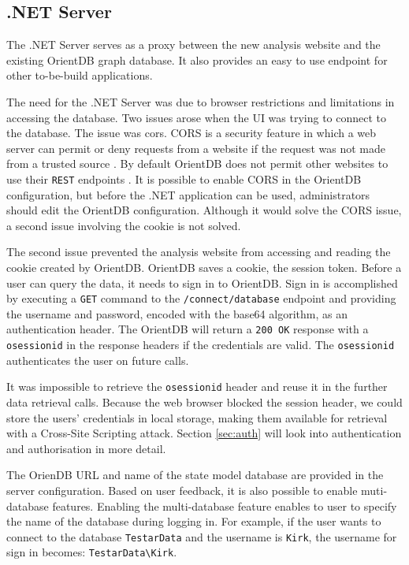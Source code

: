 \subsection{.NET Server} \label{sec:net-server}
The .NET Server serves as a proxy between the new \testar analysis website and the existing OrientDB graph database. It also provides an easy to use endpoint for other to-be-build applications.

The need for the .NET Server was due to browser restrictions and limitations in accessing the database. Two issues arose when the UI was trying to connect to the database. The issue was \acrfull{cors}. CORS is a security feature in which a web server can permit or deny requests from a website if the request was not made from a trusted source \cite{cors}. By default OrientDB does not permit other websites to use their \verb|REST| endpoints \cite{orientdb-webserver}. It is possible to enable CORS in the OrientDB configuration, but before the .NET application can be used, administrators should edit the OrientDB configuration. Although it would solve the CORS issue, a second issue involving the cookie is not solved.

The second issue prevented the analysis website from accessing and reading the cookie created by OrientDB. OrientDB saves a cookie, the session token. Before a user can query the data, it needs to sign in to OrientDB. Sign in is accomplished by executing a \verb|GET| command to the \verb|/connect/database| endpoint and providing the username and password, encoded with the base64 algorithm, as an authentication header. The OrientDB will return a \verb|200 OK| response with a \verb|osessionid| in the response headers if the credentials are valid. The \verb|osessionid| authenticates the user on future calls.

It was impossible to retrieve the \verb|osessionid| header and reuse it in the further data retrieval calls. Because the web browser blocked the session header, we could store the users' credentials in local storage, making them available for retrieval with a Cross-Site Scripting attack. Section \ref{sec:auth} will look into authentication and authorisation in more detail.

The OrienDB URL and name of the \testar state model database are provided in the server configuration. Based on user feedback, it is also possible to enable muti-database features. Enabling the multi-database feature enables to user to specify the name of the database during logging in. For example, if the user wants to connect to the database \verb|TestarData| and the username is \verb|Kirk|, the username for sign in becomes: \verb|TestarData\Kirk|.

